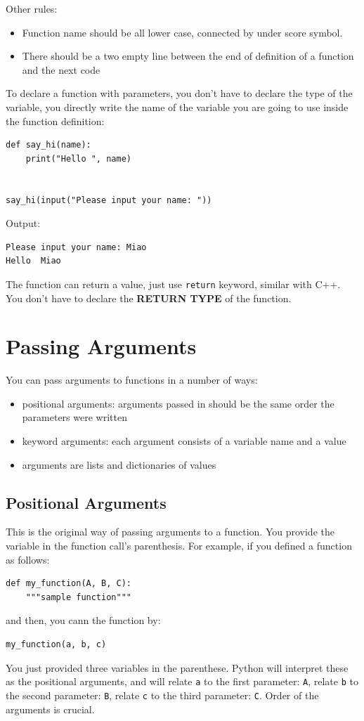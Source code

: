 \documentclass[12pt]{book}
\begin{document}
Other rules:
\begin{itemize}
\item Function name should be all lower case, connected by under score symbol.
\item There should be a two empty line between the end of definition of a function and the next code
\end{itemize}

To declare a function with parameters, you don't have to declare the type of the variable, you directly write the name of the variable you are going to use inside the function definition:
\begin{verbatim}
def say_hi(name):
    print("Hello ", name)


say_hi(input("Please input your name: "))
\end{verbatim}
Output:
\begin{verbatim}
Please input your name: Miao
Hello  Miao
\end{verbatim}

The function can return a value, just use \texttt{return} keyword, similar with C++. You don't have to declare the \textbf{RETURN TYPE} of the function.
\section{Passing Arguments}
\label{sec:orgbe11e25}
You can pass arguments to functions in a number of ways:
\begin{itemize}
\item positional arguments: arguments passed in should be the same order the parameters were written
\item keyword arguments: each argument consists of a variable name and a value
\item arguments are lists and dictionaries of values
\end{itemize}

\subsection{Positional Arguments}
\label{sec:orge45a735}
This is the original way of passing arguments to a function. You provide the variable in the function call's parenthesis. For example, if you defined a function as follows:
\begin{verbatim}
def my_function(A, B, C):
    """sample function"""
\end{verbatim}
and then, you cann the function by:
\begin{verbatim}
my_function(a, b, c)
\end{verbatim}
You just provided three variables in the parenthese. Python will interpret these as the positional arguments, and will relate \texttt{a} to the first parameter: \texttt{A}, relate \texttt{b} to the second parameter: \texttt{B}, relate \texttt{c} to the third parameter: \texttt{C}. Order of the arguments is crucial.
\end{document}
